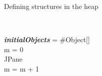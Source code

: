 \documentclass[10pt,xcolor={dvipsnames}]{beamer}
\begin{document}
\begin{frame}{Defining structures in the heap}
\begin{columns}
\begin{exampleblock}
\begin{footnotesize}
					\hspace{.3cm}  \\
					\hspace{.5cm} \textbf{\textit{initialObjects}} = \#Object[] \\
					\hspace{.5cm} m = 0 \\
					\hspace{.3cm}    JPane \\
					\hspace{.3cm}  m = m + 1 \\
				\end{footnotesize}
			\end{exampleblock}
		\end{columns}
	\end{frame}
	
	
\end{document}

